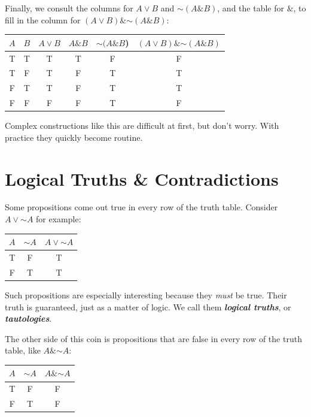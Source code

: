 \documentclass[justified]{tufte-book}
\renewcommand{\neg}{\mathbin{\sim}}
\renewcommand{\wedge}{\mathbin{\&}}
\theoremstyle{definition}
\theoremstyle{definition}
\theoremstyle{definition}
\theoremstyle{definition}
\theoremstyle{remark}
\begin{document}
Finally, we consult the columns for \(A \vee B\) and \(\neg(A \wedge B)\), and the table for \(\&\), to fill in the column for \((A \vee B) \wedge \neg(A \& B)\):

\begin{longtable}[]{@{}cccccc@{}}
\toprule
\(A\) & \(B\) & \(A \vee B\) & \(A \& B\) & \(\neg(A \wedge B\)) & \((A \vee B) \wedge \neg (A \wedge B)\) \\
\midrule
\endhead
T & T & T & T & F & F \\
T & F & T & F & T & T \\
F & T & T & F & T & T \\
F & F & F & F & T & F \\
\bottomrule
\end{longtable}

Complex constructions like this are difficult at first, but don't worry. With practice they quickly become routine.

\hypertarget{logical-truths-contradictions}{%
\section{Logical Truths \& Contradictions}\label{logical-truths-contradictions}}

Some propositions come out true in every row of the truth table. Consider \(A \vee \neg A\) for example:

\begin{longtable}[]{@{}ccc@{}}
\toprule
\(A\) & \(\neg A\) & \(A \vee \neg A\) \\
\midrule
\endhead
T & F & T \\
F & T & T \\
\bottomrule
\end{longtable}

Such propositions are especially interesting because they \emph{must} be true. Their truth is guaranteed, just as a matter of logic. We call them \textbf{\emph{logical truths}}, or \textbf{\emph{tautologies}}.

The other side of this coin is propositions that are false in every row of the truth table, like \(A \wedge \neg A\):

\begin{longtable}[]{@{}ccc@{}}
\toprule
\(A\) & \(\neg A\) & \(A \wedge \neg A\) \\
\midrule
\endhead
T & F & F \\
F & T & F \\
\bottomrule
\end{longtable}
\end{document}
